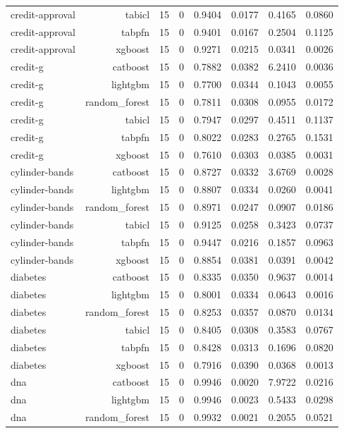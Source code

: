 \begin{table}[htbp]
\begin{tabular}{lrrrrrrr}
credit-approval & tabicl & 15 & 0 & 0.9404 & 0.0177 & 0.4165 & 0.0860 \\
credit-approval & tabpfn & 15 & 0 & 0.9401 & 0.0167 & 0.2504 & 0.1125 \\
credit-approval & xgboost & 15 & 0 & 0.9271 & 0.0215 & 0.0341 & 0.0026 \\
credit-g & catboost & 15 & 0 & 0.7882 & 0.0382 & 6.2410 & 0.0036 \\
credit-g & lightgbm & 15 & 0 & 0.7700 & 0.0344 & 0.1043 & 0.0055 \\
credit-g & random\_forest & 15 & 0 & 0.7811 & 0.0308 & 0.0955 & 0.0172 \\
credit-g & tabicl & 15 & 0 & 0.7947 & 0.0297 & 0.4511 & 0.1137 \\
credit-g & tabpfn & 15 & 0 & 0.8022 & 0.0283 & 0.2765 & 0.1531 \\
credit-g & xgboost & 15 & 0 & 0.7610 & 0.0303 & 0.0385 & 0.0031 \\
cylinder-bands & catboost & 15 & 0 & 0.8727 & 0.0332 & 3.6769 & 0.0028 \\
cylinder-bands & lightgbm & 15 & 0 & 0.8807 & 0.0334 & 0.0260 & 0.0041 \\
cylinder-bands & random\_forest & 15 & 0 & 0.8971 & 0.0247 & 0.0907 & 0.0186 \\
cylinder-bands & tabicl & 15 & 0 & 0.9125 & 0.0258 & 0.3423 & 0.0737 \\
cylinder-bands & tabpfn & 15 & 0 & 0.9447 & 0.0216 & 0.1857 & 0.0963 \\
cylinder-bands & xgboost & 15 & 0 & 0.8854 & 0.0381 & 0.0391 & 0.0042 \\
diabetes & catboost & 15 & 0 & 0.8335 & 0.0350 & 0.9637 & 0.0014 \\
diabetes & lightgbm & 15 & 0 & 0.8001 & 0.0334 & 0.0643 & 0.0016 \\
diabetes & random\_forest & 15 & 0 & 0.8253 & 0.0357 & 0.0870 & 0.0134 \\
diabetes & tabicl & 15 & 0 & 0.8405 & 0.0308 & 0.3583 & 0.0767 \\
diabetes & tabpfn & 15 & 0 & 0.8428 & 0.0313 & 0.1696 & 0.0820 \\
diabetes & xgboost & 15 & 0 & 0.7916 & 0.0390 & 0.0368 & 0.0013 \\
dna & catboost & 15 & 0 & 0.9946 & 0.0020 & 7.9722 & 0.0216 \\
dna & lightgbm & 15 & 0 & 0.9946 & 0.0023 & 0.5433 & 0.0298 \\
dna & random\_forest & 15 & 0 & 0.9932 & 0.0021 & 0.2055 & 0.0521 \\

\end{tabular}
\end{table}
